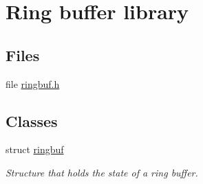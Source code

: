 \hypertarget{group__ringbuf}{\section{Ring buffer library}
\label{group__ringbuf}
}
\subsection*{Files}
\begin{DoxyCompactItemize}
\item 
file \hyperlink{ringbuf_8h}{ringbuf.\-h}
\end{DoxyCompactItemize}
\subsection*{Classes}
\begin{DoxyCompactItemize}
\item 
struct \hyperlink{structringbuf}{ringbuf}
\begin{DoxyCompactList}\small\item\em Structure that holds the state of a ring buffer. \end{DoxyCompactList}\end{DoxyCompactItemize}
